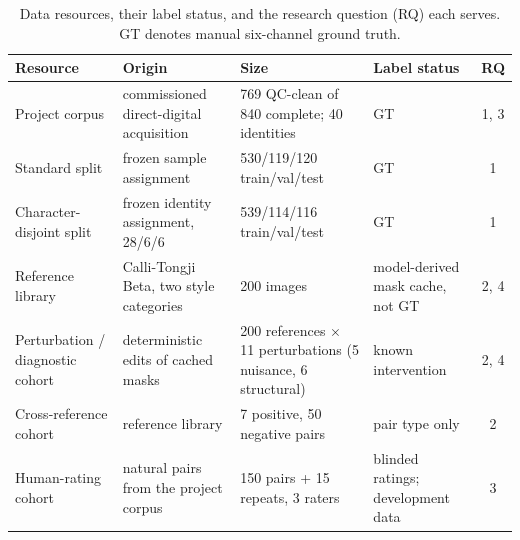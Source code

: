 \begin{table}[t]
\caption{Data resources, their label status, and the research question (RQ)
each serves. GT denotes manual six-channel ground truth.}
\label{tab:cohorts}
\centering
\scriptsize
\setlength{\tabcolsep}{4pt}
\begin{tabular}{@{}p{2.6cm}p{4.2cm}p{3.6cm}p{3.5cm}c@{}}
\toprule
Resource & Origin & Size & Label status & RQ \\
\midrule
Project corpus & commissioned direct-digital acquisition & 769 QC-clean of 840 complete; 40 identities & GT & 1, 3 \\
Standard split & frozen sample assignment & 530/119/120 train/val/test & GT & 1 \\
Character-disjoint split & frozen identity assignment, 28/6/6 & 539/114/116 train/val/test & GT & 1 \\
Reference library & Calli-Tongji Beta, two style categories & 200 images & model-derived mask cache, not GT & 2, 4 \\
Perturbation / diagnostic cohort & deterministic edits of cached masks & 200 references \(\times\) 11 perturbations (5 nuisance, 6 structural) & known intervention & 2, 4 \\
Cross-reference cohort & reference library & 7 positive, 50 negative pairs & pair type only & 2 \\
Human-rating cohort & natural pairs from the project corpus & 150 pairs + 15 repeats, 3 raters & blinded ratings; development data & 3 \\
\bottomrule
\end{tabular}
\end{table}
